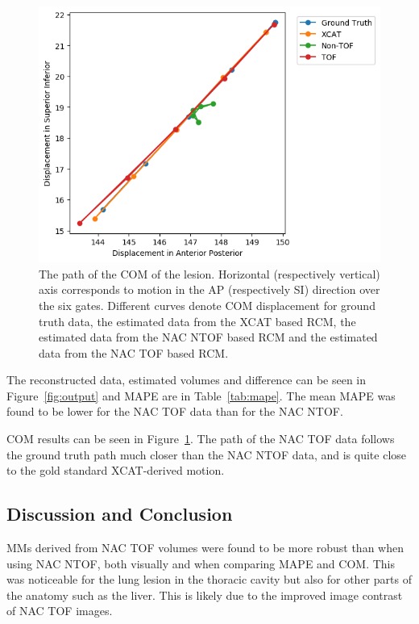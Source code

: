             \begin{figure}
                \centering
                
                \includegraphics[width=1.0\linewidth]{figures/TOF.png}
                
                \captionsetup{singlelinecheck=false, justification=raggedright}
                \caption{The path of the \gls{COM} of the lesion. Horizontal (respectively vertical) axis corresponds to motion in the \gls{AP} (respectively \gls{SI}) direction over the six gates. Different curves denote \gls{COM} displacement for  ground truth data, the estimated data from the \gls{XCAT} based \gls{RCM}, the estimated data from the \gls{NAC} \gls{NTOF} based \gls{RCM} and the estimated data from the \gls{NAC} \gls{TOF} based \gls{RCM}.} \label{fig:com_graph}
            \end{figure}
            
             The reconstructed data, estimated volumes and difference can be seen in Figure~\ref{fig:output} and \gls{MAPE} are in Table~\ref{tab:mape}. The mean \gls{MAPE} was found to be lower for the \gls{NAC} \gls{TOF} data than for the \gls{NAC} \gls{NTOF}.
            
             \gls{COM} results can be seen in Figure~\ref{fig:com_graph}. The path of the \gls{NAC} \gls{TOF} data follows the ground truth path much closer than the \gls{NAC} \gls{NTOF} data, and is quite close to the gold standard \gls{XCAT}-derived motion.
            
        \subsection{Discussion and Conclusion} \label{impact_of_tof_on_respiratory_motion_modelling_using_nac_pet_discussion_and_conclusion}
            \gls{MM}s derived from \gls{NAC} \gls{TOF} volumes were found to be more robust than when using \gls{NAC} \gls{NTOF}, both visually and when comparing \gls{MAPE} and \gls{COM}. This was noticeable for the lung lesion in the thoracic cavity but also for other parts of the anatomy such as the liver. This is likely due to the improved image contrast of \gls{NAC} \gls{TOF} images.

